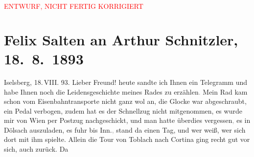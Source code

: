 
\begin{center}
            \textcolor{red}{ENTWURF, NICHT FERTIG KORRIGIERT}
                      \end{center}
            
         
         \renewcommand{\erwaehntePersonen}{Personen: Franz Defregger, Marie Glümer, Sophie Link, Michael Emil Salzmann, Philipp Salzmann, Theodor Salzmann, Hermine von Schaffgotsch}
         \renewcommand{\erwaehnteOrte}{Orte: Ampezzo, Cortina d'Ampezzo, Dölsach, Großglockner, Heiligenblut am Großglockner, Innichen, Iselsberg, Kaiser-Franz-Josefs-Höhe, Lienz, Mittewald an der Drau, Pasterze Glacier, Toblach, Wien}
         \renewcommand{\erwaehnteWerke}{}
               \section[Felix Salten an Arthur Schnitzler, 18. 8. 1893]{ Felix Salten an Arthur Schnitzler, 18. 8. 1893}\nopagebreak{}\rehead{ }\begin{ledgroupsized}[t]{13cm}\normalsize\beginnumbering \toendnotes[C]{\smallbreak\pagebreak[2]} 
\toendnotes[C]{\smallbreak}\pstart
           \raggedleft{}{\pb}Iselsberg, 18. VIII.
                  93.\pend
           \pstart
           Lieber Freund! heute sandte ich Ihnen ein Telegramm und habe Ihnen
               noch die Leidensgeschichte meines Rades zu erzählen\textcolor{gray}{.} Mein Rad kam
               schon vom Eisenbahntransporte nicht ganz wol an, die Glocke war abgeschraubt, ein
               Pedal verbogen, zudem hat es der Schnellzug nicht mitgenommen, es wurde mir von Wien per Postzug nachgeschickt, und man hatte
               überdies vergessen\textcolor{gray}{,} es in Dölsach auszuladen, es fuhr bis Inn.\textcolor{gray}{,} stand da einen Tag, und wer weiß, wer sich dort mit
               ihm spielte. Allein die Tour von Toblach nach Cortina ging recht gut vor sich, auch zurück. Da

\end{ledgroupsized}
